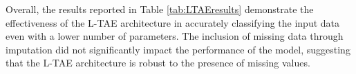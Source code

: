 Overall, the results reported in Table \ref{tab:LTAEresults} demonstrate the effectiveness of the L-TAE architecture in accurately classifying the input data even with a lower number of parameters. The inclusion of missing data through imputation did not significantly impact the performance of the model, suggesting that the L-TAE architecture is robust to the presence of missing values.